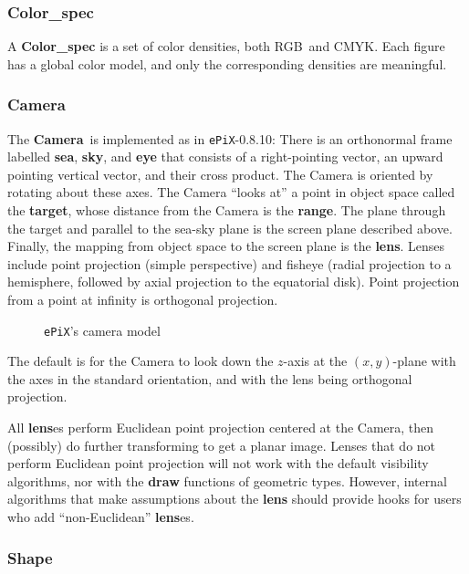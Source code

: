 \documentclass[12pt]{article}
\newcommand{\Class}[1]{\textbf{#1}}
\newcommand{\Program}[1]{\texttt{#1}}
\newcommand{\Camera}{\Class{Camera}}
\newcommand{\ePiX}{\Program{ePiX}}
\begin{document}
\subsubsection*{Color\_spec}

A \Class{Color\_spec} is a set of color densities, both RGB~and CMYK.
Each figure has a global color model, and only the corresponding
densities are meaningful.

\subsubsection*{Camera}

The \Camera\ is implemented as in \ePiX-0.8.10: There is an
orthonormal frame labelled \textbf{sea}, \textbf{sky}, and
\textbf{eye} that consists of a right-pointing vector, an upward
pointing vertical vector, and their cross product. The Camera is
oriented by rotating about these axes.  The Camera ``looks at'' a
point in object space called the \textbf{target}, whose distance from
the Camera is the \textbf{range}. The plane through the target and
parallel to the sea-sky plane is the screen plane described above.
Finally, the mapping from object space to the screen plane is the
\textbf{lens}.  Lenses include point projection (simple perspective)
and fisheye (radial projection to a hemisphere, followed by axial
projection to the equatorial disk). Point projection from a point at
infinity is orthogonal projection.%

\begin{figure}[hbt]
\begin{center}

\caption{\ePiX's camera model}
\label{fig:camera}
\end{center}
\end{figure}

The default is for the Camera to look down the $z$-axis at the
$(x,y)$-plane with the axes in the standard orientation, and with the
lens being orthogonal projection. 

All \textbf{lens}es perform Euclidean point projection centered at the
Camera, then (possibly) do further transforming to get a planar image.
Lenses that do not perform Euclidean point projection will not work
with the default visibility algorithms, nor with the \textbf{draw}
functions of geometric types. However, internal algorithms that make
assumptions about the \textbf{lens} should provide hooks for users who
add ``non-Euclidean'' \textbf{lens}es.

\subsubsection*{Shape}
\end{document}
